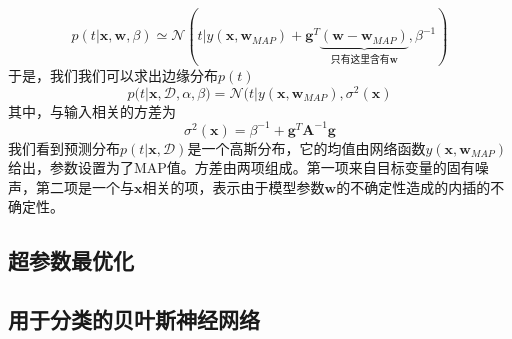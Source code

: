 \begin{equation}
	p(t|\boldsymbol{x},\boldsymbol{w},\beta)\simeq \mathcal{N}(t|y(\boldsymbol{x},\boldsymbol{w}_{MAP})+\boldsymbol{g}^T\underbrace{(\boldsymbol{w}-\boldsymbol{w}_{MAP})}_{\text{只有这里含有$\boldsymbol{w}$}},\beta^{-1} )
\end{equation}
于是，我们我们可以求出边缘分布$p(t)$
\begin{equation}
	p(t|\boldsymbol{x},\mathcal{D},\alpha,\beta)=\mathcal{N}(t|y(\boldsymbol{x},\boldsymbol{w}_{MAP}),\sigma^2(\boldsymbol{x})
\end{equation}
其中，与输入相关的方差为
\begin{equation}
	\sigma^2(\boldsymbol{x})=\beta^{-1}+\boldsymbol{g}^T\boldsymbol{A}^{-1}\boldsymbol{g}
\end{equation}
我们看到预测分布$p(t|\boldsymbol{x},\mathcal{D})$是一个高斯分布，它的均值由网络函数$y(\boldsymbol{x},\boldsymbol{w}_{MAP})$给出，参数设置为了MAP值。方差由两项组成。第一项来自目标变量的固有噪声，第二项是一个与$\boldsymbol{x}$相关的项，表示由于模型参数$\boldsymbol{w}$的不确定性造成的内插的不确定性。
\subsection*{超参数最优化}
\subsection*{用于分类的贝叶斯神经网络}